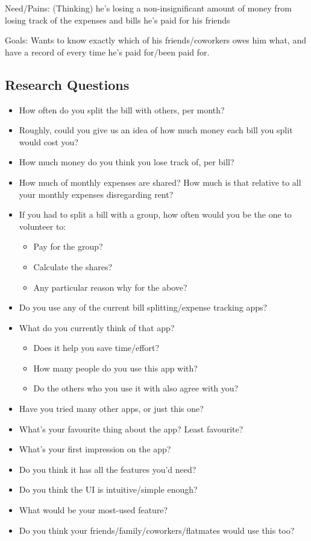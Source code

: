 \documentclass[a4wide, 11pt]{article}
\begin{document}
Need/Pains:
(Thinking) he’s losing a non-insignificant amount of money from losing track of the expenses and bills he’s paid for his friends

Goals: 
Wants to know exactly which of his friends/coworkers owes him what, and have a record of every time he’s paid for/been paid for.

\subsection{Research Questions}
\label{resQn}
\begin{itemize}
  \item How often do you split the bill with others, per month?
  \item Roughly, could you give us an idea of how much money each bill you split would cost you?
  \item How much money do you think you lose track of, per bill?
  \item How much of monthly expenses are shared? How much is that relative to all your monthly expenses disregarding rent?
  \item If you had to split a bill with a group, how often would you be the one to volunteer to:
  \begin{itemize}
    \item Pay for the group?
    \item Calculate the shares?
    \item Any particular reason why for the above?
  \end{itemize}
  \item Do you use any of the current bill splitting/expense tracking apps?
  \item What do you currently think of that app?
  \begin{itemize}
    \item Does it help you save time/effort?
    \item How many people do you use this app with?
    \item Do the others who you use it with also agree with you?
  \end{itemize}
  \item Have you tried many other apps, or just this one?
  \item What’s your favourite thing about the app? Least favourite?
  \item What’s your first impression on the app?
  \item Do you think it has all the features you’d need?
  \item Do you think the UI is intuitive/simple enough?
  \item What would be your most-used feature?
  \item Do you think your friends/family/coworkers/flatmates would use this too?
\end{itemize}
\end{document}
